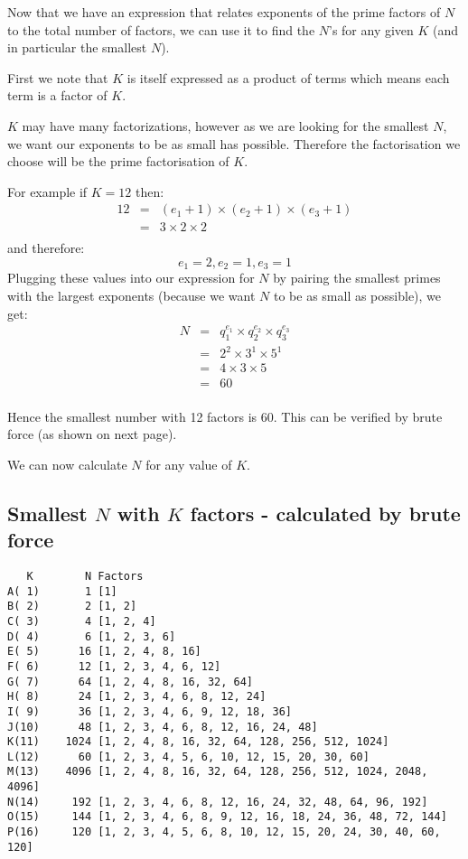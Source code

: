\documentclass{article}
\begin{document}
Now that we have an expression that relates exponents of the prime factors of $N$ to the total number of factors, we can use it to find the $N$'s for any given $K$ (and in particular the smallest $N$).

First we note that $K$ is itself expressed as a product of terms which means each term is a factor of $K$. 

$K$ may have many factorizations, however as we are looking for the smallest $N$, we want our exponents to be as small has possible. 
Therefore the factorisation we choose will be the prime factorisation of $K$.

For example if $K = 12$ then:
\begin{eqnarray*}
12 
& = & ( e_1 + 1) \times ( e_2 + 1 ) \times (e_3 + 1) \\
& = & 3 \times 2 \times 2 \\
\end{eqnarray*}
and therefore:
$$
e_1 = 2, e_2 = 1, e_3 = 1
$$
Plugging these values into our expression for $N$ by pairing the smallest primes with the largest exponents (because we want $N$ to be as small as possible), we get:
\begin{eqnarray*}
N
& = & q_1 ^ {e_1} \times q_2 ^ {e_2} \times q_3 ^ {e_3} \\
& = & 2^2 \times 3^1 \times 5^1 \\
& = & 4 \times 3 \times 5 \\
& = & 60 \\
\end{eqnarray*}

Hence the smallest number with 12 factors is 60. 
This can be verified by brute force (as shown on next page).

We can now calculate $N$ for any value of $K$.

\pagebreak
\pagestyle{fancy}

\subsection*{Smallest $N$ with $K$ factors - calculated by brute force}
\begin{verbatim}
   K        N Factors
A( 1)       1 [1]
B( 2)       2 [1, 2]
C( 3)       4 [1, 2, 4]
D( 4)       6 [1, 2, 3, 6]
E( 5)      16 [1, 2, 4, 8, 16]
F( 6)      12 [1, 2, 3, 4, 6, 12]
G( 7)      64 [1, 2, 4, 8, 16, 32, 64]
H( 8)      24 [1, 2, 3, 4, 6, 8, 12, 24]
I( 9)      36 [1, 2, 3, 4, 6, 9, 12, 18, 36]
J(10)      48 [1, 2, 3, 4, 6, 8, 12, 16, 24, 48]
K(11)    1024 [1, 2, 4, 8, 16, 32, 64, 128, 256, 512, 1024]
L(12)      60 [1, 2, 3, 4, 5, 6, 10, 12, 15, 20, 30, 60]
M(13)    4096 [1, 2, 4, 8, 16, 32, 64, 128, 256, 512, 1024, 2048, 4096]
N(14)     192 [1, 2, 3, 4, 6, 8, 12, 16, 24, 32, 48, 64, 96, 192]
O(15)     144 [1, 2, 3, 4, 6, 8, 9, 12, 16, 18, 24, 36, 48, 72, 144]
P(16)     120 [1, 2, 3, 4, 5, 6, 8, 10, 12, 15, 20, 24, 30, 40, 60, 120]
\end{verbatim}
\end{document}
